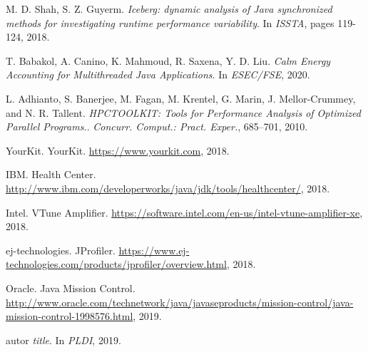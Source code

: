 \documentclass[]{usiinfthesis}
\begin{document}
\begin{thebibliography}{9}
M. D. Shah, S. Z. Guyerm.
\textit{Iceberg: dynamic analysis of Java synchronized methods for investigating runtime performance variability}. 
In \textit{ISSTA}, pages 119-124, 2018.

T. Babakol, A. Canino, K. Mahmoud, R. Saxena, Y. D. Liu.
\textit{Calm Energy Accounting for Multithreaded Java Applications}. 
In \textit{ESEC/FSE}, 2020.

L. Adhianto, S. Banerjee, M. Fagan, M. Krentel, G. Marin, J. Mellor-Crummey, and N. R. Tallent.
\textit{HPCTOOLKIT: Tools for Performance Analysis of Optimized Parallel Programs.}. 
\textit{Concurr. Comput.: Pract. Exper.}, 685–701, 2010.

YourKit. YourKit. \url{https://www.yourkit.com}, 2018.

IBM. Health Center. \url{http://www.ibm.com/developerworks/java/jdk/tools/healthcenter/}, 2018.

Intel. VTune Amplifier. \url{https://software.intel.com/en-us/intel-vtune-amplifier-xe}, 2018.

ej-technologies. JProfiler. \url{https://www.ej-technologies.com/products/jprofiler/overview.html}, 2018.

Oracle. Java Mission Control. \url{http://www.oracle.com/technetwork/java/javaseproducts/mission-control/java-mission-control-1998576.html}, 2019.

autor
\textit{title}. 
In \textit{PLDI}, 2019.





\end{thebibliography}
\end{document}
